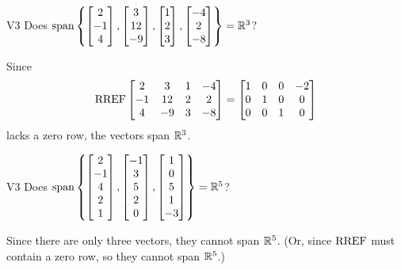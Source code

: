\begin{problem}{V3}
Does
\(
  \operatorname{span}\left\{
    \begin{bmatrix} 2 \\ -1 \\ 4 \end{bmatrix},
    \begin{bmatrix} 3 \\ 12 \\ -9 \end{bmatrix},
    \begin{bmatrix} 1 \\ 2 \\ 3 \end{bmatrix},
    \begin{bmatrix} -4 \\ 2 \\ -8 \end{bmatrix}
  \right\} = \mathbb{R}^3
\)?
\end{problem}
\begin{solution}
Since
\[
  \operatorname{RREF}\begin{bmatrix}
    2 & 3 & 1 & -4 \\
    -1 & 12 & 2 & 2 \\
    4 & -9 & 3 & -8
  \end{bmatrix} =
  \begin{bmatrix}
    1 & 0 & 0 & -2 \\
    0 & 1 & 0 & 0 \\
    0 & 0 & 1 & 0
  \end{bmatrix}
\]
lacks a zero row, the vectors span \(\mathbb{R}^3\).
\end{solution}

\begin{problem}{V3}
Does
\(
  \operatorname{span}\left\{
    \begin{bmatrix} 2 \\ -1 \\ 4 \\ 2 \\ 1 \end{bmatrix},
    \begin{bmatrix} -1 \\ 3 \\ 5 \\ 2 \\ 0 \end{bmatrix},
    \begin{bmatrix} 1 \\ 0 \\ 5 \\ 1 \\ -3 \end{bmatrix}
  \right\} = \mathbb{R}^5
\)?
\end{problem}
\begin{solution}
Since there are only three vectors, they cannot span \(\mathbb{R}^5\).
(Or, since \(\operatorname{RREF}\) must contain a zero row, so they cannot span \(\mathbb{R}^5\).)
\end{solution}
